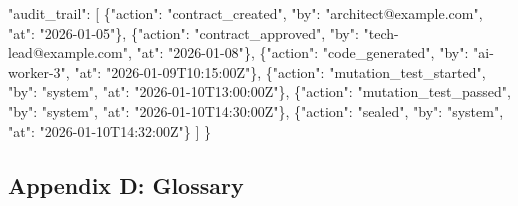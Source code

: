 \documentclass[
]{article}
\newenvironment{Shaded}{}{}
\newcommand{\DataTypeTok}[1]{\textcolor[rgb]{0.56,0.13,0.00}{#1}}
\newcommand{\FunctionTok}[1]{\textcolor[rgb]{0.02,0.16,0.49}{#1}}
\newcommand{\OtherTok}[1]{\textcolor[rgb]{0.00,0.44,0.13}{#1}}
\newcommand{\StringTok}[1]{\textcolor[rgb]{0.25,0.44,0.63}{#1}}
\begin{document}
\begin{Shaded}
\begin{Highlighting}[]
  \DataTypeTok{"audit\_trail"}\FunctionTok{:} \OtherTok{[}
    \FunctionTok{\{}\DataTypeTok{"action"}\FunctionTok{:} \StringTok{"contract\_created"}\FunctionTok{,} \DataTypeTok{"by"}\FunctionTok{:} \StringTok{"architect@example.com"}\FunctionTok{,} \DataTypeTok{"at"}\FunctionTok{:} \StringTok{"2026{-}01{-}05"}\FunctionTok{\}}\OtherTok{,}
    \FunctionTok{\{}\DataTypeTok{"action"}\FunctionTok{:} \StringTok{"contract\_approved"}\FunctionTok{,} \DataTypeTok{"by"}\FunctionTok{:} \StringTok{"tech{-}lead@example.com"}\FunctionTok{,} \DataTypeTok{"at"}\FunctionTok{:} \StringTok{"2026{-}01{-}08"}\FunctionTok{\}}\OtherTok{,}
    \FunctionTok{\{}\DataTypeTok{"action"}\FunctionTok{:} \StringTok{"code\_generated"}\FunctionTok{,} \DataTypeTok{"by"}\FunctionTok{:} \StringTok{"ai{-}worker{-}3"}\FunctionTok{,} \DataTypeTok{"at"}\FunctionTok{:} \StringTok{"2026{-}01{-}09T10:15:00Z"}\FunctionTok{\}}\OtherTok{,}
    \FunctionTok{\{}\DataTypeTok{"action"}\FunctionTok{:} \StringTok{"mutation\_test\_started"}\FunctionTok{,} \DataTypeTok{"by"}\FunctionTok{:} \StringTok{"system"}\FunctionTok{,} \DataTypeTok{"at"}\FunctionTok{:} \StringTok{"2026{-}01{-}10T13:00:00Z"}\FunctionTok{\}}\OtherTok{,}
    \FunctionTok{\{}\DataTypeTok{"action"}\FunctionTok{:} \StringTok{"mutation\_test\_passed"}\FunctionTok{,} \DataTypeTok{"by"}\FunctionTok{:} \StringTok{"system"}\FunctionTok{,} \DataTypeTok{"at"}\FunctionTok{:} \StringTok{"2026{-}01{-}10T14:30:00Z"}\FunctionTok{\}}\OtherTok{,}
    \FunctionTok{\{}\DataTypeTok{"action"}\FunctionTok{:} \StringTok{"sealed"}\FunctionTok{,} \DataTypeTok{"by"}\FunctionTok{:} \StringTok{"system"}\FunctionTok{,} \DataTypeTok{"at"}\FunctionTok{:} \StringTok{"2026{-}01{-}10T14:32:00Z"}\FunctionTok{\}}
  \OtherTok{]}
\FunctionTok{\}}
\end{Highlighting}
\end{Shaded}

\hypertarget{appendix-d-glossary}{%
\subsection{Appendix D: Glossary}\label{appendix-d-glossary}}
\end{document}
